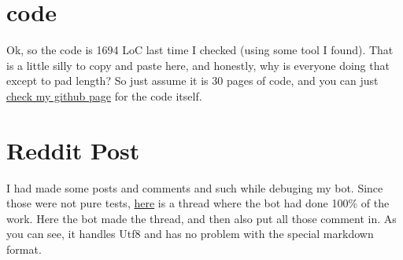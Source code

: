 \documentclass[12pt]{article}
\begin{document}
\newpage
\appendix
\section{code}

Ok, so the code is 1694 LoC last time I checked (using some tool I found).
That is a little silly to copy and paste here, and honestly, why is everyone doing that except to pad length?
So just assume it is 30 pages of code, and you can just \href{https://github.com/glop102/glop-bot}{check my github page} for the code itself.

\section{Reddit Post}

I had made some posts and comments and such while debuging my bot.
Since those were not pure tests, \href{https://www.reddit.com/r/bottest/comments/82zexp/google/}{here} is a thread where the bot had done 100\% of the work.
Here the bot made the thread, and then also put all those comment in.
As you can see, it handles Utf8 and has no problem with the special markdown format.
\end{document}
